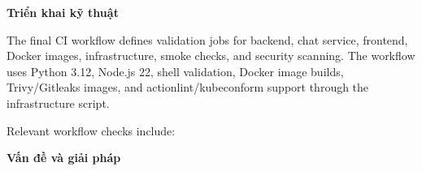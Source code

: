 \vspace{0.5em}\noindent\textbf{Triển khai kỹ
thuật}\par

The final CI workflow defines validation jobs for backend, chat service,
frontend, Docker images, infrastructure, smoke checks, and security
scanning. The workflow uses Python 3.12, Node.js 22, shell validation,
Docker image builds, Trivy/Gitleaks images, and actionlint/kubeconform
support through the infrastructure script.

Relevant workflow checks include:

\begin{Shaded}
\begin{Highlighting}[]
 
 
 
  
\end{Highlighting}
\end{Shaded}

\vspace{0.5em}\noindent\textbf{Vấn đề và giải
pháp}\par

